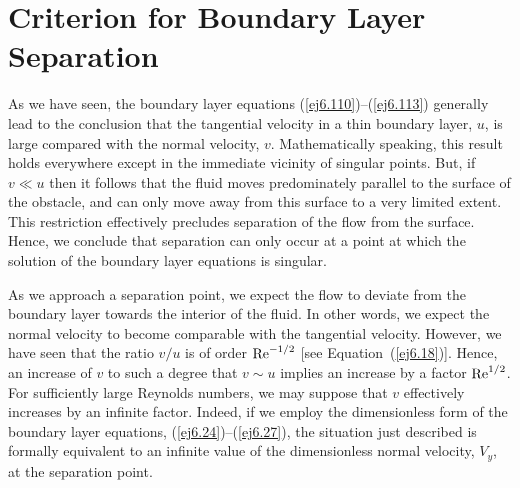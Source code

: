 \section{Criterion for Boundary Layer Separation}\label{sblsep1}
As we have seen, the boundary layer equations (\ref{ej6.110})--(\ref{ej6.113}) generally lead to the conclusion that the tangential velocity in a thin boundary layer, $u$,
is large compared with the normal velocity, $v$. Mathematically speaking, this result holds everywhere except  in the
immediate vicinity of singular points. But, if $v\ll u$ then it follows that the fluid moves predominately parallel to the surface
of the obstacle, and can only move  away from this surface to a very limited extent. This restriction effectively precludes separation of the flow from the surface. Hence, we conclude
that separation can only occur at a point at which the solution of the boundary layer
equations is singular. 

As we approach a separation point, we expect the flow to deviate from the boundary layer
towards the interior of the fluid. In other words, we expect the  normal velocity to become comparable with the
tangential velocity. However, we have seen that the ratio $v/u$ is of order ${\rm Re}^{-1/2}$ [see Equation~(\ref{ej6.18})]. Hence, an increase of $v$ to
such a degree that $v\sim u$ implies  an increase by a factor ${\rm Re}^{1/2}$. For sufficiently large Reynolds
numbers, we may suppose that $v$ effectively increases by an infinite factor. Indeed, if we employ the dimensionless form of the
boundary layer equations, (\ref{ej6.24})--(\ref{ej6.27}), the situation just described is formally
equivalent to an infinite value of the dimensionless normal velocity, $V_y$, at the separation point. 

